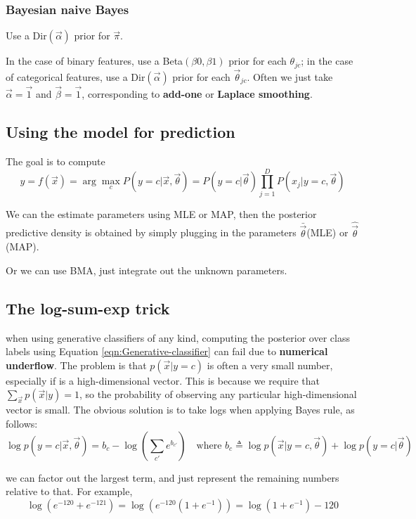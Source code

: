 \subsubsection{Bayesian naive Bayes}
\label{sec:Bayesian-naive-Bayes}
Use a Dir$(\vec{\alpha})$ prior for $\vec{\pi}$.

In the case of binary features, use a Beta$(\beta0,\beta1)$ prior for each $\theta_{jc}$; in the case of categorical features, use a Dir$(\vec{\alpha})$ prior for each  $\vec{\theta}_{jc}$. Often we just take $\vec{\alpha}=\vec{1}$ and $\vec{\beta}=\vec{1}$, corresponding to \textbf{add-one} or \textbf{Laplace smoothing}.


\subsection{Using the model for prediction}
The goal is to compute
\begin{equation}
y=f(\vec{x})=\arg\max\limits_{c}{P(y=c|\vec{x},\vec{\theta})}=P(y=c|\vec{\theta})\prod_{j=1}^D P(x_j|y=c,\vec{\theta})
\end{equation}

We can the estimate parameters using MLE or MAP, then the posterior predictive density is obtained by simply plugging in the parameters $\bar{\vec{\theta}}$(MLE) or $\hat{\vec{\theta}}$(MAP). 

Or we can use BMA, just integrate out the unknown parameters.


\subsection{The log-sum-exp trick}
when using generative classifiers of any kind, computing the posterior over class labels using Equation \eqref{eqn:Generative-classifier} can fail due to \textbf{numerical underflow}. The problem is that $p(\vec{x}|y=c)$ is often a very small number, especially if  is a high-dimensional vector. This is because we require that $\sum_{\vec{x}}p(\vec{x}|y)=1$, so the probability of observing any particular high-dimensional vector is small. The obvious solution is to take logs when applying Bayes rule, as follows:
\begin{equation}
\log p(y=c|\vec{x},\vec{\theta})=b_c-\log\left(\sum\limits_{c'}e^{b_{c'}}\right) \quad \text{where } b_c \triangleq \log p(\vec{x}|y=c,\vec{\theta})+\log p(y=c|\vec{\theta})
\end{equation}

we can factor out the largest term, and just represent the remaining numbers relative to that. For example,
\begin{equation}
\log(e^{-120}+e^{-121})=\log(e^{-120}(1+e^{-1}))=\log(1+e^{-1})-120
\end{equation}

